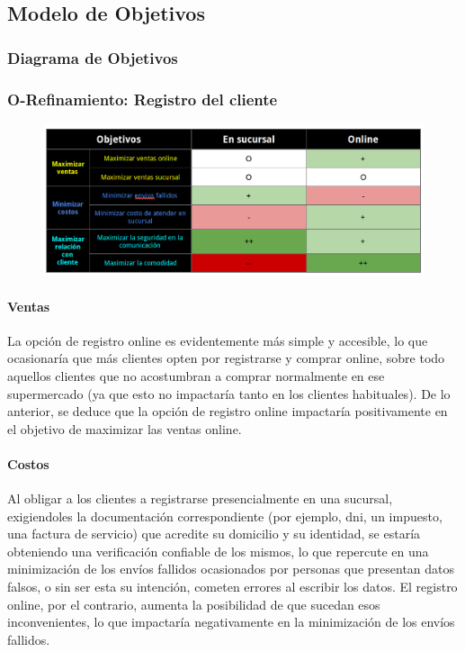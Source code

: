 \clearpage
\subsection{Modelo de Objetivos}

\subsubsection{Diagrama de Objetivos}

\newpage
\subsubsection{O-Refinamiento: Registro del cliente}
\begin{figure}[H]
  \includegraphics[width=\linewidth]{images/objetivo-blando-registro-cliente.png}
\end{figure}

\paragraph{Ventas}

La opción de registro online es evidentemente más simple y accesible, lo que
ocasionaría que más clientes opten por registrarse y comprar online, sobre todo
aquellos clientes que no acostumbran a comprar normalmente en ese supermercado
(ya que esto no impactaría tanto en los clientes habituales). De lo anterior, se
deduce que la opción de registro online impactaría positivamente en el objetivo
de maximizar las ventas online.

\paragraph{Costos}

Al obligar a los clientes a registrarse presencialmente en una sucursal,
exigiendoles la documentación correspondiente (por ejemplo, dni, un impuesto,
una factura de servicio) que acredite su domicilio y su identidad, se estaría
obteniendo una verificación confiable de los mismos, lo que repercute en una
minimización de los envíos fallidos ocasionados por personas que presentan datos
falsos, o sin ser esta su intención, cometen errores al escribir los datos. El
registro online, por el contrario, aumenta la posibilidad de que sucedan esos
inconvenientes, lo que impactaría negativamente en la minimización de los envíos
fallidos.

